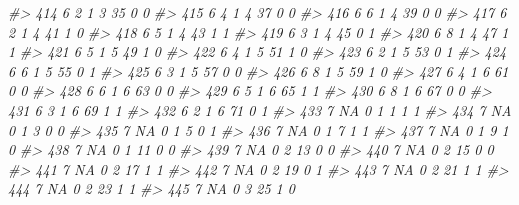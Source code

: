 \documentclass[]{book}
\newenvironment{Shaded}{\begin{snugshade}}{\end{snugshade}}
\newcommand{\CommentTok}[1]{\textcolor[rgb]{0.56,0.35,0.01}{\textit{#1}}}
\begin{document}
\begin{Shaded}
\begin{Highlighting}[]
\CommentTok{#> 414     6         2         1     3    35           0            0}
\CommentTok{#> 415     6         4         1     4    37           0            0}
\CommentTok{#> 416     6         6         1     4    39           0            0}
\CommentTok{#> 417     6         2         1     4    41           1            0}
\CommentTok{#> 418     6         5         1     4    43           1            1}
\CommentTok{#> 419     6         3         1     4    45           0            1}
\CommentTok{#> 420     6         8         1     4    47           1            1}
\CommentTok{#> 421     6         5         1     5    49           1            0}
\CommentTok{#> 422     6         4         1     5    51           1            0}
\CommentTok{#> 423     6         2         1     5    53           0            1}
\CommentTok{#> 424     6         6         1     5    55           0            1}
\CommentTok{#> 425     6         3         1     5    57           0            0}
\CommentTok{#> 426     6         8         1     5    59           1            0}
\CommentTok{#> 427     6         4         1     6    61           0            0}
\CommentTok{#> 428     6         6         1     6    63           0            0}
\CommentTok{#> 429     6         5         1     6    65           1            1}
\CommentTok{#> 430     6         8         1     6    67           0            0}
\CommentTok{#> 431     6         3         1     6    69           1            1}
\CommentTok{#> 432     6         2         1     6    71           0            1}
\CommentTok{#> 433     7        NA         0     1     1           1            1}
\CommentTok{#> 434     7        NA         0     1     3           0            0}
\CommentTok{#> 435     7        NA         0     1     5           0            1}
\CommentTok{#> 436     7        NA         0     1     7           1            1}
\CommentTok{#> 437     7        NA         0     1     9           1            0}
\CommentTok{#> 438     7        NA         0     1    11           0            0}
\CommentTok{#> 439     7        NA         0     2    13           0            0}
\CommentTok{#> 440     7        NA         0     2    15           0            0}
\CommentTok{#> 441     7        NA         0     2    17           1            1}
\CommentTok{#> 442     7        NA         0     2    19           0            1}
\CommentTok{#> 443     7        NA         0     2    21           1            1}
\CommentTok{#> 444     7        NA         0     2    23           1            1}
\CommentTok{#> 445     7        NA         0     3    25           1            0}

\end{Highlighting}
\end{Shaded}
\end{document}
